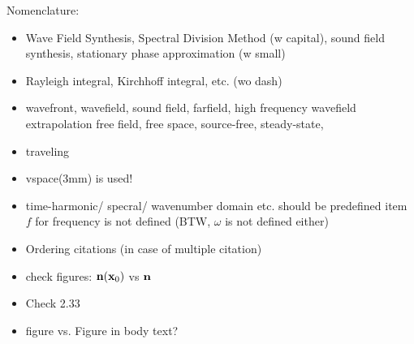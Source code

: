 Nomenclature:
\begin{itemize}
\item Wave Field Synthesis, Spectral Division Method (w capital), sound field synthesis, stationary phase approximation (w small)
\item Rayleigh integral, Kirchhoff integral, etc. (wo dash)
\item 
wavefront,
wavefield,
sound field, 
farfield,
high frequency 
wavefield extrapolation
free field,
free space,
source-free,
steady-state,
\item traveling
\item vspace(3mm) is used!
\item time-harmonic/ specral/ wavenumber domain etc. should be predefined
item $f$ for frequency is not defined (BTW, $\omega$ is not defined either)
\item Ordering citations (in case of multiple citation)
\item check figures: $\mathbf{n}(\mathbf{x}_0)$ vs $\mathbf{n}$
\item Check 2.33
\item figure vs. Figure in body text?
\end{itemize}